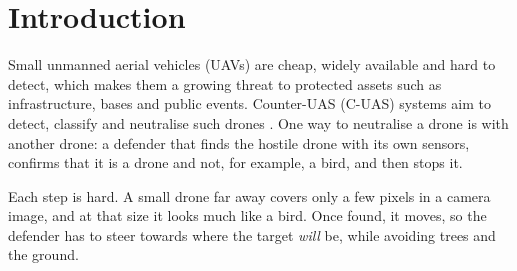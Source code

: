 \section{Introduction}
Small unmanned aerial vehicles (UAVs) are cheap, widely available and hard
to detect, which makes them a growing threat to protected assets such as
infrastructure, bases and public events. Counter-UAS (C-UAS) systems aim to
detect, classify and neutralise such drones \cite{dong2025securing}. One way
to neutralise a drone is with another drone: a defender that finds the
hostile drone with its own sensors, confirms that it is a drone and not, for
example, a bird, and then stops it.

Each step is hard. A small drone far away covers only a few pixels in a
camera image, and at that size it looks much like a bird. Once found, it
moves, so the defender has to steer towards where the target \emph{will} be,
while avoiding trees and the ground.
